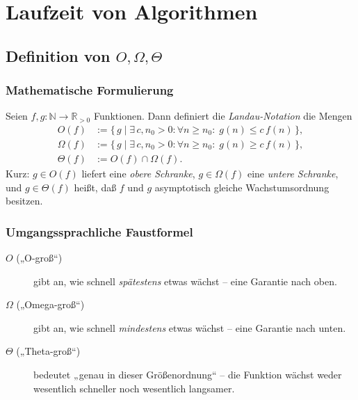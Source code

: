 
\chapter{Laufzeit von Algorithmen}

\section{\texorpdfstring{Definition von $O,\Omega,\Theta$}{Definition von O, Ω, Θ}}
\subsection*{Mathematische Formulierung}
Seien $f,g\colon \mathbb N \to \mathbb R_{>0}$ Funktionen. Dann definiert die
\emph{Landau-Notation} die Mengen
\begin{align*}
  O(f)      &:= \{\,g \mid \exists\,c,n_0>0: \forall n\ge n_0:\; g(n)\le c\,f(n)\,\},\\
  \Omega(f) &:= \{\,g \mid \exists\,c,n_0>0: \forall n\ge n_0:\; g(n)\ge c\,f(n)\,\},\\
  \Theta(f) &:= O(f)\cap\Omega(f).
\end{align*}
Kurz: $g\in O(f)$ liefert eine \emph{obere Schranke}, $g\in\Omega(f)$ eine
\emph{untere Schranke}, und $g\in\Theta(f)$ heißt, daß $f$ und $g$ asymptotisch
gleiche Wachstumsordnung besitzen.

\subsection*{Umgangssprachliche Faustformel}
\begin{description}
  \item[$O$ („O-groß“)] gibt an, wie schnell \emph{spätestens} etwas wächst – eine Garantie nach oben.
  \item[$\Omega$ („Omega-groß“)] gibt an, wie schnell \emph{mindestens} etwas wächst – eine Garantie nach unten.
  \item[$\Theta$ („Theta-groß“)] bedeutet „genau in dieser Größenordnung“ – die Funktion wächst weder wesentlich schneller noch wesentlich langsamer.
\end{description}

